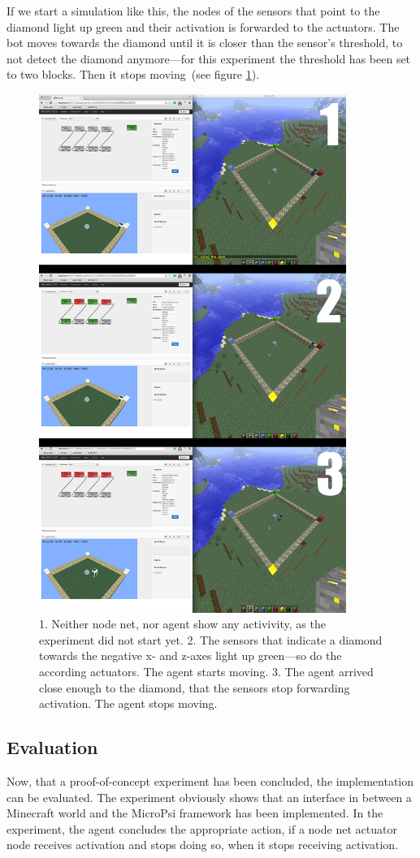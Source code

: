 If we start a simulation like this, the nodes of the sensors that point to the diamond light up green and their activation is forwarded to the actuators. The bot moves towards the diamond until it is closer than the sensor's threshold, to not detect the diamond anymore---for this experiment the threshold has been set to two blocks. Then it stops moving~(see figure \ref{diamond_screens}).

\begin{figure}[h]
  \centering
    \includegraphics[width=10cm]{graphics/diamond_screens}
  \caption{1. Neither node net, nor agent show any activivity, as the experiment did not start yet.  2. The sensors that indicate a diamond towards the negative x- and z-axes light up green---so do the according actuators. The agent starts moving.  3. The agent arrived close enough to the diamond, that the sensors stop forwarding activation. The agent stops moving.}
  \label{diamond_screens}
\end{figure}

        \subsection{Evaluation}
Now, that a proof-of-concept experiment has been concluded, the implementation can be evaluated.
The experiment obviously shows that an interface in between a Minecraft world and the MicroPsi framework has been implemented. In the experiment, the agent concludes the appropriate action, if a node net actuator node receives activation and stops doing so, when it stops receiving activation.


